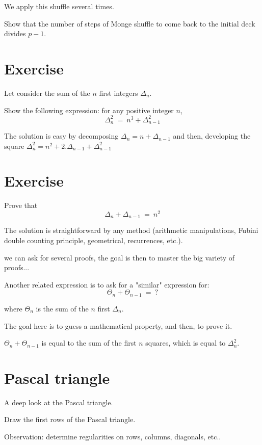 \documentclass{article}[12pt]
\begin{document}
We apply this shuffle several times.

Show that the number of steps of Monge shuffle to come back to the initial deck divides $p-1$. 



\section{Exercise}

Let consider the sum of the $n$ first integers $\Delta_n$.

Show the following expression:
for any positive integer $n$,
\[ \Delta_{n}^2 \ = \ n^3 + \Delta_{n-1}^2 \]

The solution is easy by decomposing $\Delta_{n} = n + \Delta_{n-1}$
and then, developing the square $\Delta_{n}^2 = n^2 + 2.\Delta_{n-1} + \Delta_{n-1}^2$


\section{Exercise}

Prove that 
\[ \Delta_{n} + \Delta_{n-1} \ = \ n^2  \]

The solution is straightforward by any method
(arithmetic manipulations, Fubini double counting principle, geometrical, recurrences, etc.).

we can ask for several proofs, the goal is then to master the big variety of proofs...
\bigskip

Another related expression is to ask for a "similar" expression for:
\[ \Theta_{n} + \Theta_{n-1} \ = \ ?  \]

where $\Theta_n$ is the sum of the $n$ first $\Delta_n$.

The goal here is to guess a mathematical property, and then, to prove it.

$\Theta_{n} + \Theta_{n-1} $ is equal to the sum of the first $n$ squares, which is equal to $\Delta_n^2$.


\section{Pascal triangle}

A deep look at the Pascal triangle.
\bigskip

Draw the first rows of the Pascal triangle.

Observation: determine regularities on rows, columns, diagonals, etc.. 
\end{document}
